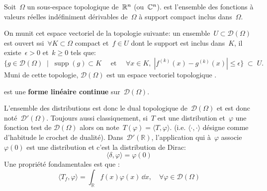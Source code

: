 \medskip
\begin{definition}
Soit~$\Omega$ un sous-espace topologique de~$\mathbb R^n$ (ou~$\mathbb C^n$).
 est l'ensemble des fonctions à valeurs réelles indéfiniment dérivables de~$\Omega$ à support compact inclus dans~$\Omega$.

On munit cet espace vectoriel de la topologie suivante: un ensemble~$U \subset \mathcal{D}(\Omega)$ est ouvert ssi~$\forall K \subset \Omega$ compact et~$f \in U$ dont le support est inclus dans~$K$, il existe~$\epsilon > 0$ et~$k \ge 0$ tels que:
\begin{equation}
  \{ g \in \mathcal{D}(\Omega)\;\mid\; \operatorname{supp}(g) \subset K\quad\text{ et }\quad\forall x \in K,\; |f^{(k)}(x)-g^{(k)}(x)|\le \epsilon \}\;\subset\;U.
\end{equation}
Muni de cette topologie, $\mathcal{D}(\Omega)$ est un espace vectoriel topologique .
\end{definition}

\medskip
\begin{definition}[Distribution]
 est une \textbf{forme linéaire continue} sur~$\mathcal{D}(\Omega)$.
\end{definition}

L'ensemble des distributions est donc le dual topologique de~$\mathcal{D}(\Omega)$ et est donc noté~$\mathcal{D}'(\Omega)$.
\medskipvm
Toujours aussi classiquement, si~$T$ est une distribution et~$\varphi$ une fonction test de $\mathcal{D}(\Omega)$ alors on note~$T(\varphi)=\langle T,\varphi \rangle$. (i.e. $\langle\cdot,\cdot\rangle$ désigne comme d'habitude le crochet de dualité).
\medskipvm
Dans~$\mathcal{D}'(\mathbb{R})$, l'application qui à~$\varphi$ associe~$\varphi(0)$ est une distribution et c'est la distribution de Dirac:
\begin{equation}
\langle\delta,\varphi\rangle=\varphi(0)
\end{equation}
\medskipvm
Une propriété fondamentales est que :
\begin{equation}
  \langle T_f,\varphi\rangle=\int_{\mathbb{R}}f(x)\varphi(x)\,\dd x, \quad \forall \varphi\in\mathcal{D}(\Omega)
\end{equation}


